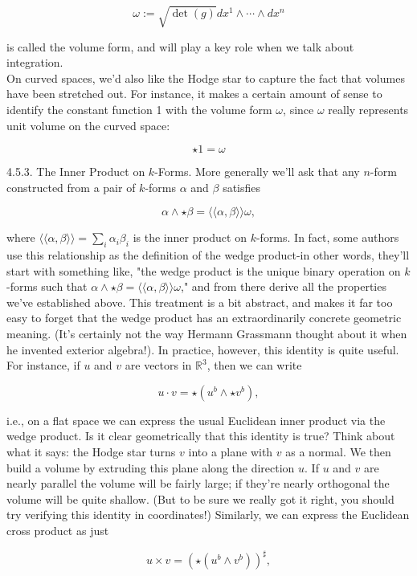 \documentclass[10pt]{article}
\begin{document}
$$
\omega:=\sqrt{\operatorname{det}(g)} d x^{1} \wedge \cdots \wedge d x^{n}
$$

is called the volume form, and will play a key role when we talk about integration.\\
On curved spaces, we'd also like the Hodge star to capture the fact that volumes have been stretched out. For instance, it makes a certain amount of sense to identify the constant function 1 with the volume form $\omega$, since $\omega$ really represents unit volume on the curved space:

$$
\star 1=\omega
$$

4.5.3. The Inner Product on $k$-Forms. More generally we'll ask that any $n$-form constructed from a pair of $k$-forms $\alpha$ and $\beta$ satisfies

$$
\alpha \wedge \star \beta=\langle\langle\alpha, \beta\rangle\rangle \omega,
$$

where $\langle\langle\alpha, \beta\rangle\rangle=\sum_{i} \alpha_{i} \beta_{i}$ is the inner product on $k$-forms. In fact, some authors use this relationship as the definition of the wedge product-in other words, they'll start with something like, "the wedge product is the unique binary operation on $k$-forms such that $\alpha \wedge \star \beta=\langle\langle\alpha, \beta\rangle\rangle \omega$," and from there derive all the properties we've established above. This treatment is a bit abstract, and makes it far too easy to forget that the wedge product has an extraordinarily concrete geometric meaning. (It's certainly not the way Hermann Grassmann thought about it when he invented exterior algebra!). In practice, however, this identity is quite useful. For instance, if $u$ and $v$ are vectors in $\mathbb{R}^{3}$, then we can write

$$
u \cdot v=\star\left(u^{b} \wedge \star v^{b}\right),
$$

i.e., on a flat space we can express the usual Euclidean inner product via the wedge product. Is it clear geometrically that this identity is true? Think about what it says: the Hodge star turns $v$ into a plane with $v$ as a normal. We then build a volume by extruding this plane along the direction $u$. If $u$ and $v$ are nearly parallel the volume will be fairly large; if they're nearly orthogonal the volume will be quite shallow. (But to be sure we really got it right, you should try verifying this identity in coordinates!) Similarly, we can express the Euclidean cross product as just

$$
u \times v=\left(\star\left(u^{b} \wedge v^{b}\right)\right)^{\sharp},
$$
\end{document}
